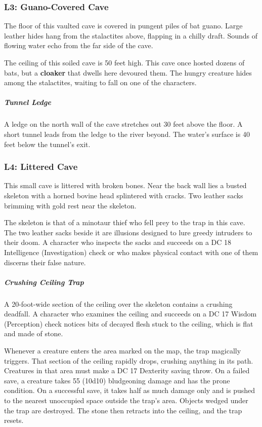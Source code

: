 \documentclass[10pt,a4paper,twoside,bg=print,twocolumn,openany,nodeprecatedcode]{dndbook}
\begin{document}
\subsubsection{L3: Guano-Covered Cave}
\begin{DndReadAloud}{}
The floor of this vaulted cave is covered in pungent piles of bat guano. Large leather hides hang from the stalactites above, flapping in a chilly draft. Sounds of flowing water echo from the far side of the cave.

\end{DndReadAloud}

The ceiling of this soiled cave is 50 feet high. This cave once hosted dozens of bats, but a \textbf{cloaker} that dwells here devoured them. The hungry creature hides among the stalactites, waiting to fall on one of the characters.

\subparagraph{Tunnel Ledge}
A ledge on the north wall of the cave stretches out 30 feet above the floor. A short tunnel leads from the ledge to the river beyond. The water's surface is 40 feet below the tunnel's exit.

\subsubsection{L4: Littered Cave}
\begin{DndReadAloud}{}
This small cave is littered with broken bones. Near the back wall lies a busted skeleton with a horned bovine head splintered with cracks. Two leather sacks brimming with gold rest near the skeleton.

\end{DndReadAloud}

The skeleton is that of a minotaur thief who fell prey to the trap in this cave. The two leather sacks beside it are illusions designed to lure greedy intruders to their doom. A character who inspects the sacks and succeeds on a DC 18 Intelligence (Investigation) check or who makes physical contact with one of them discerns their false nature.

\subparagraph{Crushing Ceiling Trap}
A 20-foot-wide section of the ceiling over the skeleton contains a crushing deadfall. A character who examines the ceiling and succeeds on a DC 17 Wisdom (Perception) check notices bits of decayed flesh stuck to the ceiling, which is flat and made of stone.

Whenever a creature enters the area marked on the map, the trap magically triggers. That section of the ceiling rapidly drops, crushing anything in its path. Creatures in that area must make a DC 17 Dexterity saving throw. On a failed save, a creature takes 55 (10d10) bludgeoning damage and has the prone condition. On a successful save, it takes half as much damage only and is pushed to the nearest unoccupied space outside the trap's area. Objects wedged under the trap are destroyed. The stone then retracts into the ceiling, and the trap resets.
\end{document}
